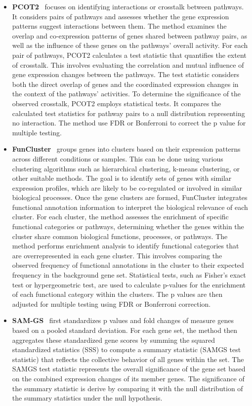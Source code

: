 \begin{itemize}
\item \textbf{PCOT2}~\cite{kong2006multivariate} focuses on identifying interactions or crosstalk between pathways. It considers pairs of pathways and assesses whether the gene expression patterns suggest interactions between them. The method examines the overlap and co-expression patterns of genes shared between pathway pairs, as well as the influence of these genes on the pathways' overall activity. For each pair of pathways, PCOT2 calculates a test statistic that quantifies the extent of crosstalk. This involves evaluating the correlation and mutual influence of gene expression changes between the pathways. The test statistic considers both the direct overlap of genes and the coordinated expression changes in the context of the pathways’ activities. To determine the significance of the observed crosstalk, PCOT2 employs statistical tests. It compares the calculated test statistics for pathway pairs to a null distribution representing no interaction. The method use FDR or Bonferroni to correct the p value for multiple testing.

\item \textbf{FunCluster}~\cite{henegar2006clustering}  groups genes into clusters based on their expression patterns across different conditions or samples. This can be done using various clustering algorithms such as hierarchical clustering, k-means clustering, or other suitable methods.
The goal is to identify sets of genes with similar expression profiles, which are likely to be co-regulated or involved in similar biological processes. Once the gene clusters are formed, FunCluster integrates functional annotation information to interpret the biological relevance of each cluster.
For each cluster, the method assesses the enrichment of specific functional categories or pathways, determining whether the genes within the cluster share common biological functions, processes, or pathways. The method performs enrichment analysis to identify functional categories that are overrepresented in each gene cluster. This involves comparing the observed frequency of functional annotations in the cluster to their expected frequency in the background gene set.
Statistical tests, such as Fisher's exact test or hypergeometric test, are used to calculate p-values for the enrichment of each functional category within the clusters. The p values are then adjusted for multiple testing using FDR or Bonferroni correction.

\item \textbf{SAM-GS}~\cite{dinu2007improving} first standardizes p values and fold changes of measure genes based on a pooled standard deviation. For each gene set, the method then aggregates these standardized gene scores by summing the squared standardized statistics (SSS) to compute a summary statistic (SAMGS test statistic) that reflects the collective behavior of all genes within the set. The SAMGS test statistic represents the overall significance of the gene set based on the combined expression changes of its member genes. The significance of the summary statistic is derive by comparing it with the null distribution of the summary statistics under the null hypothesis.


\end{itemize}
